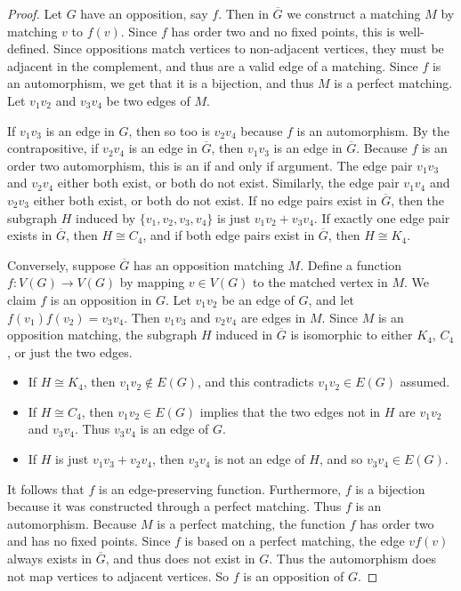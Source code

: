 \documentclass[11pt]{article}
\theoremstyle{definition}
\begin{document}
\begin{proof}
    Let $G$ have an opposition, say $f$. Then in $\overline{G}$ we construct a
    matching $M$ by matching $v$ to $f(v)$. Since $f$ has order two and no
    fixed points, this is well-defined. Since oppositions match vertices to
    non-adjacent vertices, they must be adjacent in the complement, and thus
    are a valid edge of a matching. Since $f$ is an automorphism, we get that
    it is a bijection, and thus $M$ is a perfect matching. Let $v_1v_2$ and
    $v_3v_4$ be two edges of $M$.

    If $v_1v_3$ is an edge in $G$, then so too is $v_2v_4$ because $f$ is an
    automorphism. By the contrapositive, if $v_2v_4$ is an edge in
    $\overline{G}$, then $v_1v_3$ is an edge in $\overline{G}$. Because $f$ is
    an order two automorphism, this is an if and only if argument. The edge
    pair $v_1v_3$ and $v_2v_4$ either both exist, or both do not exist.
    Similarly, the edge pair $v_1v_4$ and $v_2v_3$ either both exist, or both
    do not exist. If no edge pairs exist in $\overline{G}$, then the subgraph
    $H$ induced by $\{v_1,v_2,v_3,v_4\}$ is just $v_1v_2+v_3v_4$. If exactly
    one edge pair exists in $\overline{G}$, then $H \cong C_4$, and if both
    edge pairs exist in $\overline{G}$, then $H \cong K_4$.

    Conversely, suppose $\overline{G}$ has an opposition matching $M$. Define a
    function $f:V(G)\to V(G)$ by mapping $v\in V(G)$ to the matched vertex in
    $M$. We claim $f$ is an opposition in $G$. Let $v_1v_2$ be an edge of $G$,
    and let $f(v_1)f(v_2)=v_3v_4$. Then $v_1v_3$ and $v_2v_4$ are edges in $M$.
    Since $M$ is an opposition matching, the subgraph $H$ induced in
    $\overline{G}$ is isomorphic to either $K_4$, $C_4$, or just the two edges. 
    \begin{itemize}
        \item
            If $H\cong K_4$, then $v_1v_2\not\in E(G)$, and this contradicts
            $v_1v_2\in E(G)$ assumed.
        \item
            If $H\cong C_4$, then $v_1v_2\in E(G)$ implies that the two edges
            not in $H$ are $v_1v_2$ and $v_3v_4$. Thus $v_3v_4$ is an edge of
            $G$.
        \item
            If $H$ is just $v_1v_3 + v_2v_4$, then $v_3v_4$ is not an edge of
            $H$, and so $v_3v_4\in E(G)$.
    \end{itemize}
    It follows that $f$ is an edge-preserving function. Furthermore, $f$ is a
    bijection because it was constructed through a perfect matching. Thus $f$
    is an automorphism. Because $M$ is a perfect matching, the function $f$ has
    order two and has no fixed points. Since $f$ is based on a perfect
    matching, the edge $vf(v)$ always exists in $\overline{G}$, and thus does
    not exist in $G$. Thus the automorphism does not map vertices to adjacent
    vertices. So $f$ is an opposition of $G$.
\end{proof}
\end{document}
